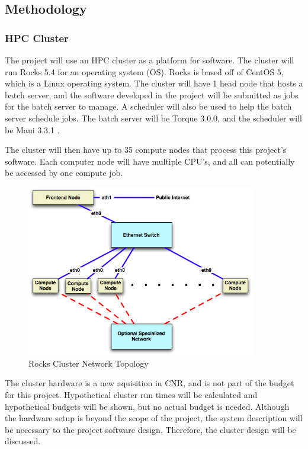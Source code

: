 \subsection{Methodology}

\subsubsection{HPC Cluster}
\label{sec:hpc}

The project will use an HPC cluster as a platform for software. The cluster 
will run Rocks 5.4 for an operating system (OS). Rocks is based off of CentOS 5,
which is a Linux operating system. The cluster will have 1 head node that hosts
a batch server, and the software developed in the project will be submitted as
jobs for the batch server to manage. A scheduler will also be used to help the
batch server schedule jobs. The batch server will be Torque 3.0.0, and the 
scheduler will be Maui 3.3.1 . 

The cluster will then have up to 35 
compute nodes that process this project's software. Each computer node will
have multiple CPU's, and all can potentially be accessed by one compute job.

\begin{figure}[h]
	\begin{center}
	\includegraphics[width=100mm]{images/cluster.png}
	\caption{Rocks Cluster Network Topology \cite{rocks}} 
	\end{center}
\end{figure}

The cluster hardware is a new aquisition in CNR, and is not part of the budget
for this project. Hypothetical cluster run times will be calculated and 
hypothetical budgets will be shown, but no actual budget is needed. 
Although the hardware setup is beyond the scope of the project, the system
description will be necessary to the project software design. Therefore, the 
cluster design will be discussed.

